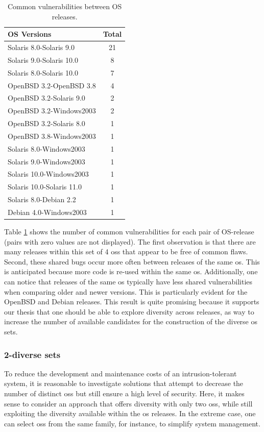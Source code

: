 \begin{table}[!ht]
\begin{center}
{\scriptsize
\begin{tabular}{|l|c|}\hline
\textbf{OS Versions} & Total  \\\hline\hline
Solaris 8.0-Solaris 9.0 	&21\\
Solaris 9.0-Solaris 10.0 	&8\\
Solaris 8.0-Solaris 10.0 	&7\\
OpenBSD 3.2-OpenBSD 3.8 & 4 \\
OpenBSD 3.2-Solaris 9.0 & 2 \\
OpenBSD 3.2-Windows2003 & 2 \\
OpenBSD 3.2-Solaris 8.0 & 1 \\
OpenBSD 3.8-Windows2003 & 1 \\
Solaris 8.0-Windows2003 & 1 \\
Solaris 9.0-Windows2003 & 1 \\
Solaris 10.0-Windows2003 & 1 \\
Solaris 10.0-Solaris 11.0	& 1 \\
Solaris 8.0-Debian 2.2 &	1 \\
Debian 4.0-Windows2003 & 1 \\\hline
\end{tabular}
\caption{Common vulnerabilities between OS releases.}
\label{tab:vulns_releases}
}
\end{center}
\end{table}

Table \ref{tab:vulns_releases} shows the number of common vulnerabilities for each pair of OS-release (pairs with zero values are not displayed). 
The first observation is that there are many releases within this set of 4 \glspl{os} that appear to be free of common flaws. 
Second, these shared bugs occur more often between releases of the same \gls{os}. 
This is anticipated because more code is re-used within the same \gls{os}.
Additionally, one can notice that releases of the same \gls{os} typically have less shared vulnerabilities when comparing older and newer versions. 
This is particularly evident for the OpenBSD and Debian releases. 
This result is quite promising because it supports our thesis that one should be able to explore diversity across releases, as way to increase the number of available candidates for the construction of the diverse \gls{os} sets.


\subsubsection*{2-diverse sets} 
To reduce the development and maintenance costs of an intrusion-tolerant system, it is reasonable to investigate solutions that attempt to decrease the number of distinct \glspl{os} but still ensure a high level of security. 
Here, it makes sense to consider an approach that offers diversity with only two \glspl{os}, while still exploiting the diversity available within the \gls{os} releases. 
In the extreme case, one can select \glspl{os} from the same family, for instance, to simplify system management.

